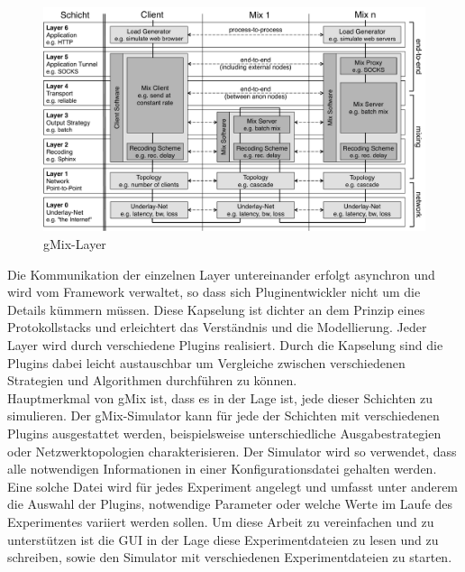 \documentclass[a4paper, 11pt]{article} %
\begin{document}
\begin{figure}
     \centering
     \includegraphics[width=\textwidth]{img/simulatorNamingNew.pdf}
     \caption{gMix-Layer}
     \label{img:gMixLayers}
\end{figure}

Die Kommunikation der einzelnen Layer untereinander erfolgt asynchron und wird vom Framework verwaltet, so dass sich Pluginentwickler nicht um die Details kümmern müssen. Diese Kapselung ist dichter an dem Prinzip eines Protokollstacks und erleichtert das Verständnis und die Modellierung. Jeder Layer wird durch verschiedene Plugins realisiert. Durch die Kapselung sind die Plugins dabei leicht austauschbar um Vergleiche zwischen verschiedenen Strategien und Algorithmen durchführen zu können.
\\

Hauptmerkmal von gMix ist, dass es in der Lage ist, jede dieser Schichten zu simulieren. Der gMix-Simulator kann für jede der Schichten mit verschiedenen Plugins ausgestattet werden, beispielsweise unterschiedliche Ausgabestrategien oder Netzwerktopologien charakterisieren.
Der Simulator wird so verwendet, dass alle notwendigen Informationen in einer Konfigurationsdatei gehalten werden. Eine solche Datei wird für jedes Experiment angelegt und umfasst unter anderem die Auswahl der Plugins, notwendige Parameter oder welche Werte im Laufe des Experimentes variiert werden sollen. Um diese Arbeit zu vereinfachen und zu unterstützen ist die GUI in der Lage diese Experimentdateien zu lesen und zu schreiben, sowie den Simulator mit verschiedenen Experimentdateien zu starten.
\end{document}
